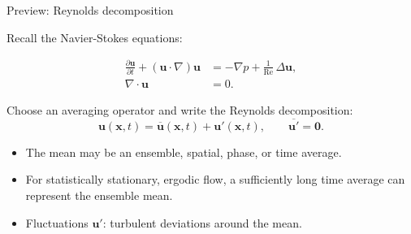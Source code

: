 \documentclass[aspectratio=169,11pt]{beamer}
\newcommand{\uu}{\bm{u}}
\newcommand{\pp}{p}
\newcommand{\Rey}{\mathrm{Re}}
\begin{document}

\begin{frame}{Preview: Reynolds decomposition}

Recall the Navier-Stokes equations:

\begin{align*}
\frac{\partial\uu}{\partial t} + (\uu\cdot\nabla)\uu &= -\nabla \pp + \frac{1}{\Rey}\, \Delta \uu,\\
\nabla\cdot\uu &= 0.
\end{align*}

Choose an averaging operator and write the Reynolds decomposition:
\[
\uu(\bm{x},t) = \overline{\uu}(\bm{x},t) + \uu'(\bm{x},t),
\qquad \overline{\uu'}=\bm{0}.
\]
\begin{itemize}
  \item The mean may be an ensemble, spatial, phase, or time average.
  \item For statistically stationary, ergodic flow, a sufficiently long time average can represent the ensemble mean.
  \item Fluctuations $\uu'$: turbulent deviations around the mean.
\end{itemize}

\end{frame}
\end{document}
